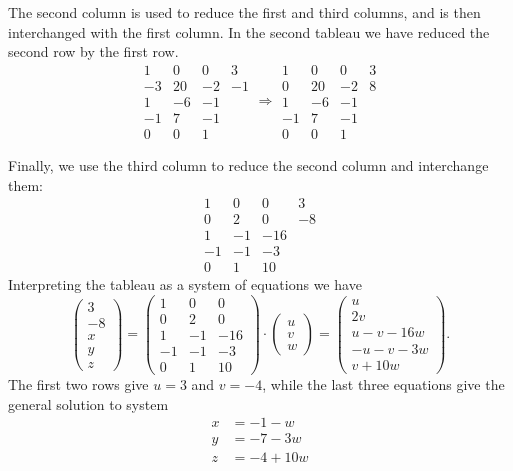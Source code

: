 The second column is used to reduce the first and third columns, and
is then interchanged with the first column.  In the second tableau we
have reduced the second row by the first row. 
\[
\begin{array}{rrrr}
1 & 0 & 0 & 3 \\
-3 & 20 & -2 & -1 \\
1 & -6 & -1 &  \\
-1 & 7 & -1 &  \\
0 & 0 & 1 &  
\end{array}
\Longrightarrow
\begin{array}{rrrr}
1 & 0 & 0 & 3 \\
0 & 20 & -2 & 8 \\
1 & -6 & -1 &  \\
-1 & 7 & -1 &  \\
0 & 0 & 1 &  
\end{array}
\]

Finally, we use the third column to reduce the second column and
interchange them:
\[
\begin{array}{rrrr}
1 & 0 & 0 & 3 \\
0 & 2 & 0 & -8 \\
1 & -1 & -16 &  \\
-1 & -1 & -3 &  \\
0 & 1 & 10 &  
\end{array}
\]
Interpreting the tableau as a system of equations we have
\[
\begin{pmatrix}3 \\ -8 \\ x \\ y \\ z \end{pmatrix} =
\begin{pmatrix}1 & 0 & 0 \\ 0 & 2 & 0 \\
1 & -1 & -16 \\ -1 & -1 & -3 \\ 0 & 1 & 10 \end{pmatrix} \cdot
\begin{pmatrix}u \\ v \\ w \end{pmatrix}
=
\begin{pmatrix}u \\ 2 v \\ 
u - v -16 w \\
-u -v -3 w \\
v + 10w \end{pmatrix}.
\]
The first two rows give $u = 3$ and $v = -4$, while the last three
equations give the general solution to system
\[
\begin{aligned}
x &= -1 - w \\
y &= -7 - 3 w \\
z & = -4 + 10 w
\end{aligned}
\]

